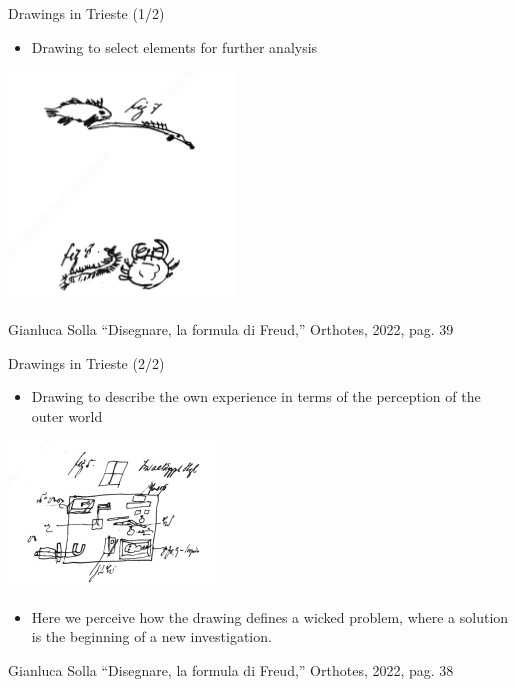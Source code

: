 \documentclass{beamer}
\begin{document}
\begin{frame}
{\centerline{Drawings in Trieste (1/2)}}

\begin{itemize}
   \item Drawing to select elements for further analysis
 \end{itemize} 


\begin{center}
 \includegraphics[width=6cm]{P2023.AIBCCSS.Drawing/selectingElementsFreud.jpg}
 
 \end{center}

\begin{center}
\tiny
Gianluca Solla ``Disegnare, la formula di Freud,'' Orthotes, 2022, pag. 39
\end{center}
\end{frame}

\begin{frame}
{\centerline{Drawings in Trieste (2/2)}}

\begin{itemize}
   \item Drawing to describe the own experience in terms of the perception of the outer world
 \end{itemize} 


\begin{center}
 \includegraphics[width=5.5cm]{P2023.AIBCCSS.Drawing/outerWorld.jpg}
 
 \end{center}

\begin{itemize}
   \item Here we perceive how the drawing defines a wicked problem, where a solution is the beginning of a new investigation.
 \end{itemize} 

\begin{center}
\tiny
Gianluca Solla ``Disegnare, la formula di Freud,'' Orthotes, 2022, pag. 38
\end{center}
\end{frame}
\end{document}
